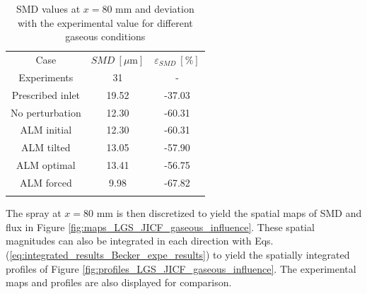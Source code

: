\begin{table}[!h]
\centering
\caption{SMD values at $x = 80$ mm and deviation with the experimental value for different gaseous conditions}
\begin{tabular}{ccc}
\thickhline
Case & $SMD~\left[\mu \mathrm{m} \right]$ & $\varepsilon_{SMD}~\left[\% \right]$ \\
\thickhline
Experiments & 31 & - \\
Prescribed inlet & 19.52 & -37.03 \\
No perturbation & 12.30 & -60.31 \\
ALM initial & 12.30 & -60.31 \\
ALM tilted & 13.05 & -57.90 \\
ALM optimal & 13.41 & -56.75 \\
ALM forced & 9.98 & -67.82 \\
\thickhline
\end{tabular}
\label{tab:SMD_deviations_gaseous_inlet}
\end{table}

The spray at $x = 80$ mm is then discretized to yield the spatial maps of SMD and flux in Figure \ref{fig:maps_LGS_JICF_gaseous_influence}. These spatial magnitudes can also be integrated in each direction with Eqs. (\ref{eq:integrated_results_Becker_expe_results}) to yield the spatially integrated profiles of Figure \ref{fig:profiles_LGS_JICF_gaseous_influence}. The experimental maps and profiles are also displayed for comparison. 

